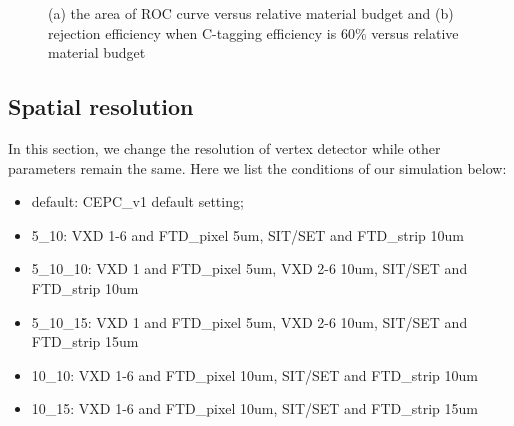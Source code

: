 \documentclass[usetikz]{style/cepcnote}
\begin{document}
\begin{figure}[!ht]
	\centering
	\caption{(a) the area of ROC curve versus relative material budget and (b) rejection efficiency when C-tagging efficiency is 60\% versus relative material budget}
	\label{fig:CROC_area}
\end{figure}


\subsection{Spatial resolution}

In this section, we change the resolution of vertex detector while other parameters remain the same. Here we list the conditions of our simulation below:
\begin{itemize}
	\item default: CEPC\_v1 default setting;
	\item 5\_10: VXD 1-6 and FTD\_pixel 5um, SIT/SET and FTD\_strip 10um
	\item 5\_10\_10: VXD 1 and FTD\_pixel 5um, VXD 2-6 10um, SIT/SET and FTD\_strip 10um
	\item 5\_10\_15: VXD 1 and FTD\_pixel 5um, VXD 2-6 10um, SIT/SET and FTD\_strip 15um
	\item 10\_10: VXD 1-6 and FTD\_pixel 10um, SIT/SET and FTD\_strip 10um
	\item 10\_15: VXD 1-6 and FTD\_pixel 10um, SIT/SET and FTD\_strip 15um
\end{itemize}
\end{document}
